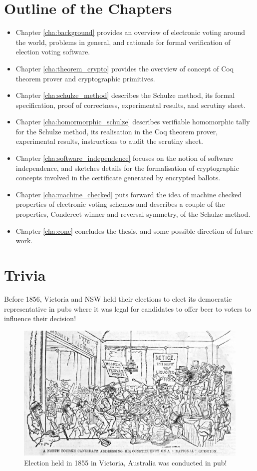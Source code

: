 \section{Outline of the Chapters}
\begin{itemize}

\item Chapter \ref{cha:background} provides an overview of electronic voting around the world, 
problems in general, and rationale for formal verification of election voting software. 
\item Chapter \ref{cha:theorem_crypto} provides the overview of concept of 
Coq theorem prover  and cryptographic primitives.  
\item Chapter \ref{cha:schulze_method} 
describes the Schulze method, its formal specification, proof of correctness, experimental results, 
and scrutiny sheet.  
\item Chapter \ref{cha:homormorphic_schulze} describes 
verifiable homomorphic tally for the Schulze method, its realisation in the Coq theorem prover, experimental 
results,  instructions to audit the scrutiny sheet. 
\item Chapter \ref{cha:software_independence} focuses on the notion of software independence, and 
sketches details for the formalisation of  cryptographic concepts involved in the 
certificate generated by encrypted ballots. 
\item Chapter \ref{cha:machine_checked} puts forward the idea of 
machine checked properties of electronic voting schemes and describes a couple of the 
properties,  Condercet winner and reversal symmetry, of the Schulze method. 
\item Chapter \ref{cha:conc} concludes the thesis, and some possible direction of future work. 
\end{itemize}


\section{Trivia}
 Before 1856, Victoria and NSW held their elections to elect its 
	  democratic representative in pubs where it was legal for 
	  candidates to offer beer to voters to influence their 
	  decision! 
	  
	   \begin{figure}[htb]
	\begin{center}
	\includegraphics[scale=0.25]{NorthBourke.jpg}
	\caption{Election held in 1855 in Victoria, Australia 
	  was conducted in pub!}
	\end{center}
  \end{figure}   
  
